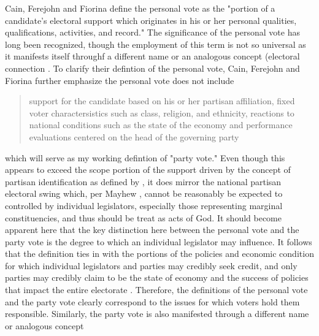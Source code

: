 \documentclass[hyphens, crop=false]{standalone}
\begin{document}
		Cain, Ferejohn and Fiorina
		\autocite*{cainPersonalVoteConstituency1987}
		define the personal vote as the "portion of a candidate's electoral support which originates in his or her
		personal qualities,
		qualifications,
		activities,
		and record." 
		\autocite*[9]{cainPersonalVoteConstituency1987}
		The significance of the personal vote has long been recognized,
		though the employment of this term is not so universal as it manifests itself throughf a different name or an analogous concept
		(electoral connection
		\autocites[home style][]{fennoHomeStyleHouse1978}[electoral connection][]{mayhewCongressElectoralConnection1974}[personal reputation][]{careyIncentivesCultivatePersonal1995}[dyadic representation][]{millerConstituencyInfluenceCongress1963}{weissbergCollectiveVsDyadic1978}{ansolabehereDyadicRepresentation2011}[personal representation][]{colomerPersonalRepresentationNeglected2011}[local vote][]{pattieWinningLocalVote1995}.
		To clarify their defintion of the personal vote,
		Cain, Ferejohn and Fiorina
		\autocite*[9]{cainPersonalVoteConstituency1987}
		further emphasize the personal vote does not include
		\begin{quotation}
			support for the candidate based on his or her partisan affiliation, fixed voter charactersistics such as class, religion, and ethnicity, reactions to national conditions such as the state of the economy and performance evaluations centered on the head of the governing party
		\end{quotation}
		which will serve as my working defintion of "party vote." Even though this appears to exceed the scope portion of the support driven by the concept of partisan identification as defined by
		\citeauthor{campbellAmericanVoter1960}
		\autocite*[121]{campbellAmericanVoter1960},
		it does mirror the national partisan electoral swing which,
		per
		Mayhew
		\autocite*[28,32]{mayhewCongressElectoralConnection1974},
		cannot be reasonably be expected to controlled by
		individual legislators,
		especially those representing marginal constituencies,
		and thus should be treat as acts of God.
		It should become apparent here that
		the key distinction here between the personal vote and the party vote is
		the degree to which an individual legislator may influence.
		It follows that the definition ties in with
		the portions of the policies and economic condition
		for which individual legislators and parties may credibly seek credit,
		and only parties may credibly claim to be the state of economy and the success of policies that impact the entire electorate
		\autocite{mayhewCongressElectoralConnection1974}.
		Therefore,
		the definitions of the personal vote and the party vote clearly correspond to the issues for which voters hold them responsible. Similarly,
		the party vote is also manifested through a different name or analogous concept
		\autocites[partisan representation][]{hurleyPartisanRepresentationRealignment1991}[collective representation][]{weissbergCollectiveVsDyadic1978}[normal vote][]{converseConceptNormalVote1966}[partisan reputation][]{careyIncentivesCultivatePersonal1995}
		
\end{document}
